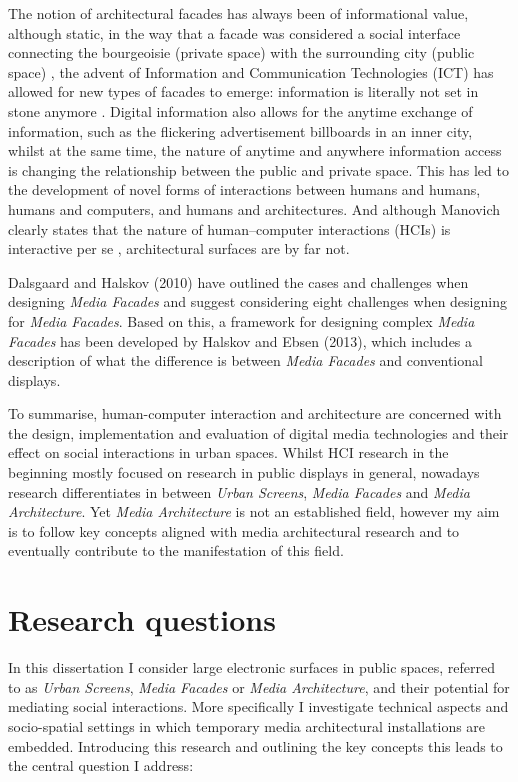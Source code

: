 The notion of architectural facades has always been of informational value, although static, in the way that a facade was considered a social interface connecting the bourgeoisie (private space) with the surrounding city (public space) \cite{Neumeyer_2002}, the advent of Information and Communication Technologies (ICT) has allowed for new types of facades to emerge: information is literally not set in stone anymore \cite{Haeussler_2009}. Digital information also allows for the anytime exchange of information, such as the flickering advertisement billboards in an inner city, whilst at the same time, the nature of anytime and anywhere information access is changing the relationship between the public and private space. This has led to the development of novel forms of interactions between humans and humans, humans and computers, and humans and architectures. And although Manovich clearly states that the nature of human–computer interactions (HCIs) is interactive per se \cite{Manovich_2001}, architectural surfaces are by far not. 

Dalsgaard and Halskov (2010) have outlined the cases and challenges when designing \textit{Media Facades} and suggest considering eight challenges when designing for \textit{Media Facades}. 
Based on this, a framework for designing complex \textit{Media Facades} has been developed by Halskov and Ebsen (2013), which includes a description of what the difference is between \textit{Media Facades} and conventional displays.
 
To summarise, human-computer interaction and architecture are concerned with the design, implementation and evaluation of digital media technologies and their effect on social interactions in urban spaces. Whilst HCI research in the beginning mostly focused on research in public displays in general, nowadays research differentiates in between \textit{Urban Screens}, \textit{Media Facades} and \textit{Media Architecture}. Yet \textit{Media Architecture} is not an established field, however my aim is to follow key concepts aligned with media architectural research and to eventually contribute to the manifestation of this field. 


\section{Research questions}

In this dissertation I consider large electronic surfaces in public spaces, referred to as \textit{Urban Screens}, \textit{Media Facades} or \textit{Media Architecture}, and their potential for mediating social interactions. More specifically I investigate  technical aspects and socio-spatial settings in which temporary media architectural installations are embedded. Introducing this research and outlining the key concepts this leads to the central question I address:
  
